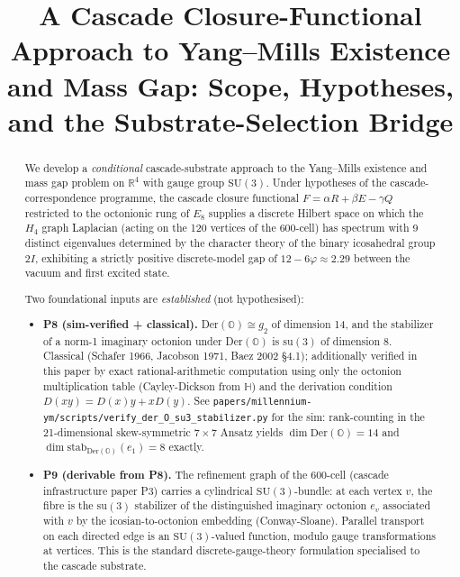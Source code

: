 \documentclass[11pt, a4paper]{amsart}
\title{A Cascade Closure-Functional Approach to Yang--Mills Existence and Mass Gap: Scope, Hypotheses, and the Substrate-Selection Bridge}
\author{}
\date{}
\theoremstyle{definition}
\newcommand{\R}{\mathbb{R}}
\begin{document}
\maketitle

\begin{abstract}
We develop a \emph{conditional} cascade-substrate approach to the
Yang--Mills existence and mass gap problem on $\R^4$ with gauge
group $\mathrm{SU}(3)$. Under hypotheses of the
cascade-correspondence programme, the cascade closure functional
$F = \alpha R + \beta E - \gamma Q$ restricted to the octonionic
rung of $E_8$ supplies a discrete Hilbert space on which the
$H_4$ graph Laplacian (acting on the 120 vertices of the
600-cell) has spectrum with 9 distinct eigenvalues determined by
the character theory of the binary icosahedral group $2I$,
exhibiting a strictly positive discrete-model gap of $12 - 6\varphi
\approx 2.29$ between the vacuum and first excited state.

Two foundational inputs are \emph{established} (not hypothesised):
\begin{itemize}
\item \textbf{P8 (sim-verified + classical).}
  Der$(\mathbb{O}) \cong g_2$ of dimension 14, and the stabilizer of
  a norm-1 imaginary octonion under Der$(\mathbb{O})$ is
  $\mathrm{su}(3)$ of dimension 8. Classical (Schafer 1966, Jacobson
  1971, Baez 2002 §4.1); additionally verified in this paper by
  exact rational-arithmetic computation using only the octonion
  multiplication table (Cayley-Dickson from $\mathbb{H}$) and the
  derivation condition $D(xy) = D(x)y + xD(y)$. See
  \texttt{papers/millennium-ym/scripts/verify\_der\_O\_su3\_stabilizer.py}
  for the sim: rank-counting in the 21-dimensional skew-symmetric
  $7 \times 7$ Ansatz yields $\dim \mathrm{Der}(\mathbb{O}) = 14$ and
  $\dim \mathrm{stab}_{\mathrm{Der}(\mathbb{O})}(e_1) = 8$ exactly.
\item \textbf{P9 (derivable from P8).}
  The refinement graph of the 600-cell (cascade infrastructure
  paper P3) carries a cylindrical $\mathrm{SU}(3)$-bundle: at each
  vertex $v$, the fibre is the $\mathrm{su}(3)$ stabilizer of the
  distinguished imaginary octonion $e_v$ associated with $v$ by
  the icosian-to-octonion embedding (Conway-Sloane). Parallel
  transport on each directed edge is an $\mathrm{SU}(3)$-valued
  function, modulo gauge transformations at vertices. This is the
  standard discrete-gauge-theory formulation specialised to the
  cascade substrate.
\end{itemize}


\end{abstract}
\end{document}
